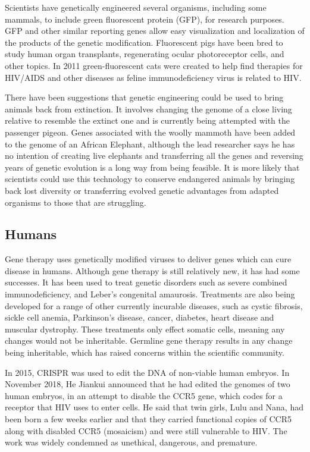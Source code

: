 Scientists have genetically engineered several organisms, including some mammals, to include green fluorescent protein (GFP), for research purposes. GFP and other similar reporting genes allow easy visualization and localization of the products of the genetic modification. Fluorescent pigs have been bred to study human organ transplants, regenerating ocular photoreceptor cells, and other topics. In 2011 green-fluorescent cats were created to help find therapies for HIV/AIDS and other diseases as feline immunodeficiency virus is related to HIV.

There have been suggestions that genetic engineering could be used to bring animals back from extinction. It involves changing the genome of a close living relative to resemble the extinct one and is currently being attempted with the passenger pigeon. Genes associated with the woolly mammoth have been added to the genome of an African Elephant, although the lead researcher says he has no intention of creating live elephants and transferring all the genes and reversing years of genetic evolution is a long way from being feasible. It is more likely that scientists could use this technology to conserve endangered animals by bringing back lost diversity or transferring evolved genetic advantages from adapted organisms to those that are struggling.

\hypertarget{humans}{%
\subsection{Humans}\label{humans}}

Gene therapy uses genetically modified viruses to deliver genes which can cure disease in humans. Although gene therapy is still relatively new, it has had some successes. It has been used to treat genetic disorders such as severe combined immunodeficiency, and Leber's congenital amaurosis. Treatments are also being developed for a range of other currently incurable diseases, such as cystic fibrosis, sickle cell anemia, Parkinson's disease, cancer, diabetes, heart disease and muscular dystrophy. These treatments only effect somatic cells, meaning any changes would not be inheritable. Germline gene therapy results in any change being inheritable, which has raised concerns within the scientific community.

In 2015, CRISPR was used to edit the DNA of non-viable human embryos. In November 2018, He Jiankui announced that he had edited the genomes of two human embryos, in an attempt to disable the CCR5 gene, which codes for a receptor that HIV uses to enter cells. He said that twin girls, Lulu and Nana, had been born a few weeks earlier and that they carried functional copies of CCR5 along with disabled CCR5 (mosaicism) and were still vulnerable to HIV. The work was widely condemned as unethical, dangerous, and premature.

